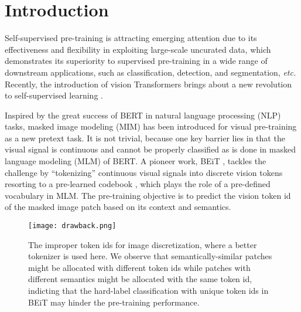 \documentclass[runningheads]{llncs}
\begin{document}
\section{Introduction}
Self-supervised pre-training \cite{beit,simclr,mocov3,ibot,vicreg,barlow,clip} is attracting emerging attention due to its effectiveness and flexibility in exploiting large-scale uncurated data, which demonstrates its superiority to supervised pre-training in a wide range of downstream applications, such as classification, detection, and segmentation, \textit{etc.} 
Recently, the introduction of vision Transformers \cite{vit,deit,swinT} brings about a new revolution to self-supervised learning \cite{beit,mocov3,dino}. 

Inspired by the great success of BERT \cite{BERT} in natural language processing (NLP) tasks, masked image modeling (MIM) has been introduced for visual pre-training as a new pretext task.
It is not trivial, because one key barrier lies in that the visual signal is continuous and cannot be properly classified as is done in masked language modeling (MLM) of BERT.
A pioneer work, BEiT \cite{beit}, tackles the challenge by ``tokenizing'' continuous visual signals into discrete vision tokens resorting to a pre-learned codebook \cite{dalle},
which plays the role of a pre-defined vocabulary in MLM. 
The pre-training objective is to predict the vision token id of the masked image patch based on its context and semantics.












\begin{figure}[t]
\begin{center}
\texttt{[image: drawback.png]}
\caption{
The improper token ids for image discretization, where a better tokenizer \cite{taming} is used here. 
We observe that semantically-similar patches might be allocated with different token ids while patches with different semantics might be allocated with the same token id, indicting that the hard-label classification with unique token ids in BEiT \cite{beit} may hinder the pre-training performance. }
\label{fig:drawback}
\end{center}
\end{figure}
\end{document}
